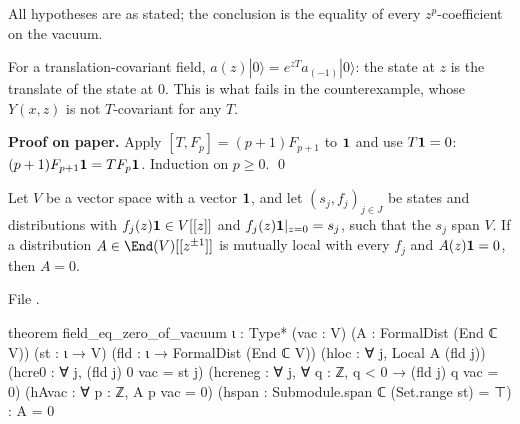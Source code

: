 \begin{dictionary}
All hypotheses are as stated; the conclusion is the equality of every $z^p$-coefficient on the vacuum.
\end{dictionary}

\begin{physics}
For a translation-covariant field, $a(z)|0\rangle = e^{zT}a_{(-1)}|0\rangle$: the state at $z$ is the
translate of the state at $0$. This is what fails in the counterexample, whose $Y(x,z)$ is not
$T$-covariant for any $T$.
\end{physics}

\textbf{Proof on paper.} Apply $[T,F_p] = (p+1)F_{p+1}$ to $\mathbf{1}$ and use $T\mathbf{1} = 0$:
$(p+1)F_{p+1}\mathbf{1} = TF_p\mathbf{1}$. Induction on $p\ge0$. \qed

\begin{theorem}\label{l03:thm:fieldzero}
Let $V$ be a vector space with a vector $\mathbf{1}$, and let $(s_j,f_j)_{j\in J}$ be states and distributions with
$f_j(z)\mathbf{1}\in V[[z]]$ and $f_j(z)\mathbf{1}|_{z=0} = s_j$, such that the $s_j$ span $V$. If a distribution
$A\in\End(V)[[z^{\pm1}]]$ is mutually local with every $f_j$ and $A(z)\mathbf{1} = 0$, then $A = 0$.
\end{theorem}
\noindent File .
\begin{leancode}
theorem field_eq_zero_of_vacuum {ι : Type*} (vac : V) (A : FormalDist (End ℂ V))
    (st : ι → V) (fld : ι → FormalDist (End ℂ V))
    (hloc : ∀ j, Local A (fld j))
    (hcre0 : ∀ j, (fld j) 0 vac = st j)
    (hcreneg : ∀ j, ∀ q : ℤ, q < 0 → (fld j) q vac = 0)
    (hAvac : ∀ p : ℤ, A p vac = 0)
    (hspan : Submodule.span ℂ (Set.range st) = ⊤) :
    A = 0
\end{leancode}

